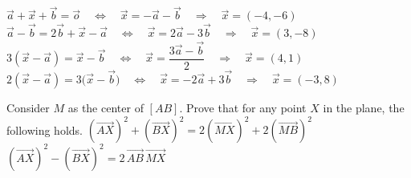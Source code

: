 \begin{Answer}\phantom{}
    
	\Question $\vec{a}+\vec{x}+\vec{b}=\vec{o} \quad \Leftrightarrow \quad \vec{x} = -\vec{a}-\vec{b} \quad \Rightarrow \quad \vec{x} = (-4,-6)$  
	\Question $\vec{a}-\vec{b}=2\vec{b}+\vec{x}-\vec{a} \quad \Leftrightarrow \quad \vec{x} = 2\vec{a} - 3 \vec{b} \quad \Rightarrow \quad \vec{x} = (3,-8) $ 
	\Question $3\left(\vec{x}-\vec{a}\right)=\vec{x}-\vec{b} \quad \Leftrightarrow \quad \vec{x} = \dfrac{3 \vec{a} - \vec{b}}{2} \quad \Rightarrow \quad \vec{x} = (4,1)$
	\Question $2\left(\vec{x}-\vec{a}\right)=3\bigl(\vec{x}-\vec{b}\bigr) \quad \Leftrightarrow \quad \vec{x} =  -2\vec{a}+3\vec{b} \quad \Rightarrow \quad \vec{x} = (-3,8) $
\end{Answer}


\ifanalysis
\begin{Exercise} Consider $M$ as the center of $[AB]$. Prove that for any point $X$ in the plane, the following holds. %
	\Question[difficulty = 2] $\left(\overrightarrow{AX}\right)^2+\left(\overrightarrow{BX}\right)^2=2\left(\overrightarrow{MX}\right)^2+2\left(\overrightarrow{MB}\right)^2$
	\Question[difficulty = 2] $\left(\overrightarrow{AX}\right)^2-\left(\overrightarrow{BX}\right)^2=2\,\overrightarrow{AB}\, \overrightarrow{MX}$

\end{Exercise}

